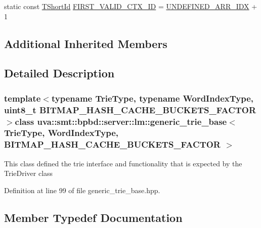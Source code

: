 \begin{DoxyCompactItemize}
\item 
static const \hyperlink{namespaceuva_1_1smt_1_1bpbd_1_1server_1_1lm_1_1identifiers_a33043a191e9a637dea742a89d23c8bdc}{T\+Short\+Id} \hyperlink{classuva_1_1smt_1_1bpbd_1_1server_1_1lm_1_1generic__trie__base_a54abc3730778b6237fe456b1a6cf8dad}{F\+I\+R\+S\+T\+\_\+\+V\+A\+L\+I\+D\+\_\+\+C\+T\+X\+\_\+\+I\+D} = \hyperlink{classuva_1_1smt_1_1bpbd_1_1server_1_1lm_1_1generic__trie__base_a3e961dc1d0e7bd38134573227f818b8b}{U\+N\+D\+E\+F\+I\+N\+E\+D\+\_\+\+A\+R\+R\+\_\+\+I\+D\+X} + 1
\end{DoxyCompactItemize}
\subsection*{Additional Inherited Members}


\subsection{Detailed Description}
\subsubsection*{template$<$typename Trie\+Type, typename Word\+Index\+Type, uint8\+\_\+t B\+I\+T\+M\+A\+P\+\_\+\+H\+A\+S\+H\+\_\+\+C\+A\+C\+H\+E\+\_\+\+B\+U\+C\+K\+E\+T\+S\+\_\+\+F\+A\+C\+T\+O\+R$>$class uva\+::smt\+::bpbd\+::server\+::lm\+::generic\+\_\+trie\+\_\+base$<$ Trie\+Type, Word\+Index\+Type, B\+I\+T\+M\+A\+P\+\_\+\+H\+A\+S\+H\+\_\+\+C\+A\+C\+H\+E\+\_\+\+B\+U\+C\+K\+E\+T\+S\+\_\+\+F\+A\+C\+T\+O\+R $>$}

This class defined the trie interface and functionality that is expected by the Trie\+Driver class 

Definition at line 99 of file generic\+\_\+trie\+\_\+base.\+hpp.



\subsection{Member Typedef Documentation}
\hypertarget{classuva_1_1smt_1_1bpbd_1_1server_1_1lm_1_1generic__trie__base_ace5120d75920dacafb1564eca63b6885}{}
